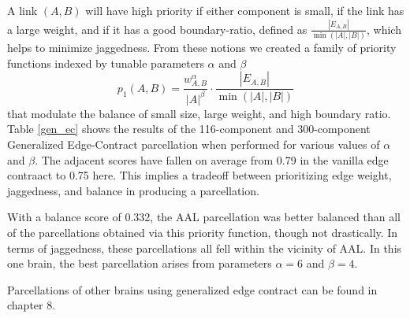 A link $(A, B)$ will have high priority if either component is small,
if the link has a large weight, and if it has a good boundary-ratio,
defined as $\frac{|E_{A,B}|}{\min(|A|,|B|)}$, which helps to minimize
jaggedness. From these notions we created a family of priority
functions indexed by tunable parameters $\alpha$ and $\beta$
\begin{equation} \label{priority_func}
p_1(A, B) = \frac{w_{A,B}^\alpha}{|A|^\beta} \cdot
            \frac{|E_{A,B}|}{\min(|A|,|B|)}
\end{equation}
that modulate the balance of small size, large weight, and high
boundary ratio. Table \ref{gen_ec} shows the results of the
116-component and 300-component Generalized Edge-Contract parcellation
when performed for various values of $\alpha$ and $\beta$. The adjacent
scores have fallen on average from 0.79 in the vanilla edge contraact
to 0.75 here. This implies a tradeoff between prioritizing edge weight,
jaggedness, and balance in producing a parcellation.

With a balance score of 0.332, the AAL parcellation was better balanced
than all of the parcellations obtained via this priority function,
though not drastically. In terms of jaggedness, these parcellations
all fell within the vicinity of AAL. In this one brain, the best
parcellation arises from parameters $\alpha = 6$ and $\beta = 4$.

Parcellations of other brains using generalized edge contract can be
found in chapter 8.
